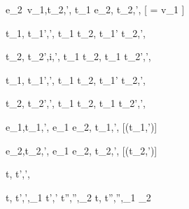   {e_2\ v_1,\sigma \normalise t_2,\sigma',\phi}
  {t_1 \Next e_2,\sigma \handle{\Continue} t_2,\sigma',\phi}
  [ = v_1 \land \neg{}]


  {t_1,\sigma {} t_1',\sigma',\phi}
  {t_1 \And t_2,\sigma {} t_1' \And t_2,\sigma',\phi}

  {t_2,\sigma {} t_2',i,\sigma',\phi}
  {t_1 \And t_2,\sigma {} t_1 \And t_2',\sigma',\phi}


  {t_1,\sigma {} t_1',\sigma',\phi}
  {t_1 \Or t_2,\sigma {} t_1' \Or t_2,\sigma',\phi}

  {t_2,\sigma {} t_2',\sigma',\phi }
  {t_1 \Or t_2,\sigma {} t_1 \Or t_2',\sigma',\phi}


  {e_1,\sigma \normalise t_1,\sigma',\phi}
  {e_1 \Xor e_2,\sigma \handle{\Left} t_1,\sigma',\phi}
  [\neg\Failing(t_1,\sigma')]

  {e_2,\sigma \normalise t_2,\sigma',\phi}
  {e_1 \Xor e_2,\sigma \handle{\Right} t_2,\sigma',\phi}
  [\neg\Failing(t_2,\sigma')]





  {t,\sigma {} t',\sigma',\phi}


  {t,\sigma {} t',\sigma',\phi_1 \Quad
   t',\sigma' \normalise t'',\sigma'',\phi_2}
  {t,\sigma {} t'',\sigma'',\phi_1 \land \phi_2}
